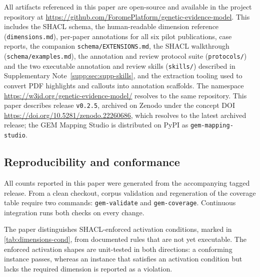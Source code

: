 All artifacts referenced in this paper are open-source and
available in the project repository at
\url{https://github.com/ForomePlatform/genetic-evidence-model}.
This includes the SHACL schema, the human-readable dimension
reference (\texttt{dimensions.md}), per-paper annotations for all
six pilot publications, case reports, the companion
\texttt{schema/EXTENSIONS.md}, the SHACL walkthrough
(\texttt{schema/examples.md}), the annotation and review protocol
suite (\texttt{protocols/}) and the two executable annotation and
review skills (\texttt{skills/}) described in Supplementary Note~\ref*{supp:sec:supp-skills},
and the extraction tooling used to
convert PDF highlights and callouts into annotation scaffolds. The
namespace \url{https://w3id.org/genetic-evidence-model/} resolves
to the same repository. This paper describes release \texttt{v0.2.5},
archived on Zenodo under the concept DOI
\url{https://doi.org/10.5281/zenodo.22260686}, which resolves to the
latest archived release;
the GEM Mapping Studio is distributed on PyPI as
\texttt{gem-mapping-studio}.

\subsection*{Reproducibility and conformance}

All counts reported in this paper were generated from the accompanying
tagged release. From a clean checkout, corpus validation and regeneration of
the coverage table require two commands: \texttt{gem-validate} and
\texttt{gem-coverage}. Continuous integration runs both checks on every
change.

The paper distinguishes SHACL-enforced activation conditions, marked in
\cref{tab:dimensions-cond}, from documented rules that are not yet
executable. The enforced activation shapes are unit-tested in both
directions: a conforming instance passes, whereas an instance that satisfies
an activation condition but lacks the required dimension is reported as a
violation.

